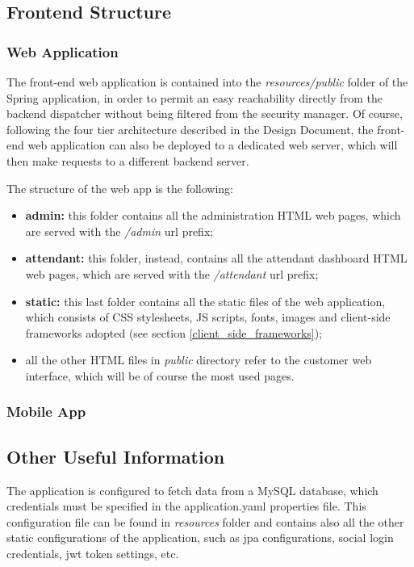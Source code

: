 \documentclass[table, 12pt]{article}
\begin{document}
\subsection{Frontend Structure}
\subsubsection{Web Application}
The front-end web application is contained into the \textit{resources/public} folder of the Spring application, in order to permit an easy reachability directly from the backend dispatcher without being filtered from the security manager.
Of course, following the four tier architecture described in the Design Document, the front-end web application can also be deployed to a dedicated web server, which will then make requests to a different backend server.

The structure of the web app is the following:
\begin{itemize}
    \item \textbf{admin:} this folder contains all the administration HTML web pages, which are served with the \textit{/admin} url prefix;
    \item \textbf{attendant:} this folder, instead, contains all the attendant dashboard HTML web pages, which are served with the \textit{/attendant} url prefix;
    \item \textbf{static:} this last folder contains all the static files of the web application, which consists of CSS stylesheets, JS scripts, fonts, images and client-side frameworks adopted (see section \ref{client_side_frameworks});
    \item all the other HTML files in \textit{public} directory refer to the customer web interface, which will be of course the most used pages.
\end{itemize}
\subsubsection{Mobile App}

\subsection{Other Useful Information}
The application is configured to fetch data from a MySQL database, which credentials must be specified in the application.yaml properties file. This configuration file can be found in \textit{resources} folder and contains also all the other static configurations of the application, such as jpa configurations, social login credentials, jwt token settings, etc.
\newpage
\end{document}

